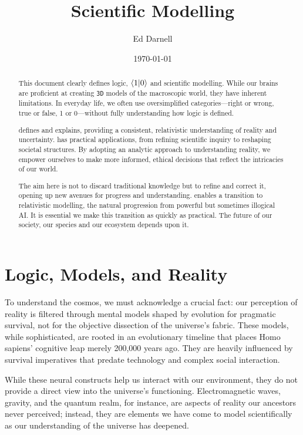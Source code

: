 \documentclass[12pt]{article}
\title{\iR{} Scientific Modelling}
\author{Ed Darnell}
\date{\today}
\begin{document}
\maketitle
\begin{abstract}
    This document clearly defines logic, \(\langle 1 | 0 \rangle\) and \iR{} scientific modelling. While our brains are proficient at creating \texttt{3D} models of the macroscopic world, they have inherent limitations. In everyday life, we often use oversimplified categories—right or wrong, true or false, 1 or 0—without fully understanding how logic is defined.

    \iR{} defines and explains, providing a consistent, relativistic understanding of reality and uncertainty. \iR{} has practical applications, from refining scientific inquiry to reshaping societal structures. By adopting an analytic approach to understanding reality, we empower ourselves to make more informed, ethical decisions that reflect the intricacies of our world.

    The aim here is not to discard traditional knowledge but to refine and correct it, opening up new avenues for progress and understanding. \iR{} enables a transition to relativistic modelling, the natural progression from powerful but sometimes illogical AI. It is essential we make this transition as quickly as practical. The future of our society, our species and our ecosystem depends upon it.
\end{abstract}
\section*{Logic, Models, and Reality}
To understand the cosmos, we must acknowledge a crucial fact: our perception of reality is filtered through mental models shaped by evolution for pragmatic survival, not for the objective dissection of the universe's fabric. These models, while sophisticated, are rooted in an evolutionary timeline that places Homo sapiens' cognitive leap merely 200,000 years ago. They are heavily influenced by survival imperatives that predate technology and complex social interaction.

While these neural constructs help us interact with our environment, they do not provide a direct view into the universe's functioning. Electromagnetic waves, gravity, and the quantum realm, for instance, are aspects of reality our ancestors never perceived; instead, they are elements we have come to model scientifically as our understanding of the universe has deepened.
\end{document}
